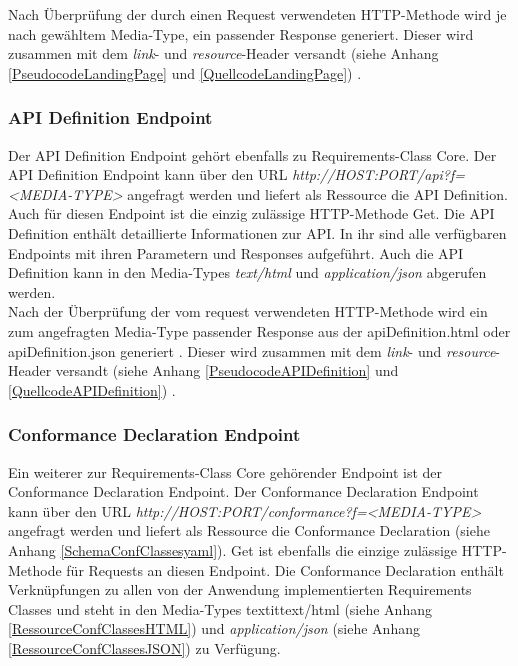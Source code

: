 Nach Überprüfung der durch einen Request verwendeten HTTP-Methode wird je nach gewähltem Media-Type, ein passender Response generiert. 
Dieser wird zusammen mit dem \textit{link}- und \textit{resource}-Header
versandt (siehe Anhang \ref{PseudocodeLandingPage} und \ref{QuellcodeLandingPage}) \cite{ogc_api_processes_core}. 

\subsubsection{API Definition Endpoint}
Der API Definition Endpoint gehört ebenfalls zu Requirements-Class Core.
Der API Definition Endpoint kann über den URL \textit{http://HOST:PORT/api?f=<MEDIA-TYPE>} angefragt werden und liefert als Ressource die API Definition. 
Auch für diesen Endpoint ist die einzig zulässige HTTP-Methode Get. 
Die API Definition enthält detaillierte Informationen zur API. In ihr sind alle verfügbaren Endpoints mit ihren Parametern und Responses aufgeführt. 
Auch die API Definition kann in den Media-Types \textit{text/html} und \textit{application/json} abgerufen werden.\\

             
Nach der Überprüfung der vom request verwendeten HTTP-Methode wird ein zum angefragten Media-Type passender Response aus der apiDefinition.html oder 
apiDefinition.json generiert . 
Dieser wird zusammen mit dem \textit{link}- und \textit{resource}-Header versandt (siehe Anhang \ref{PseudocodeAPIDefinition} und \ref{QuellcodeAPIDefinition}) 
\cite{ogc_api_processes_core}. 

\subsubsection{Conformance Declaration Endpoint}
Ein weiterer zur Requirements-Class Core gehörender Endpoint ist der Conformance Declaration Endpoint.
Der Conformance Declaration Endpoint kann über den URL \textit{http://HOST:PORT/conformance?f=<MEDIA-TYPE>} angefragt werden und liefert als 
Ressource die Conformance Declaration (siehe Anhang \ref{SchemaConfClassesyaml}). Get ist ebenfalls die einzige zulässige HTTP-Methode für Requests an diesen Endpoint.
Die Conformance Declaration enthält Verknüpfungen zu allen von der Anwendung implementierten Requirements Classes und steht in den Media-Types textit{text/html} 
(siehe Anhang \ref{RessourceConfClassesHTML}) und \textit{application/json} (siehe Anhang \ref{RessourceConfClassesJSON}) zu Verfügung.\\

